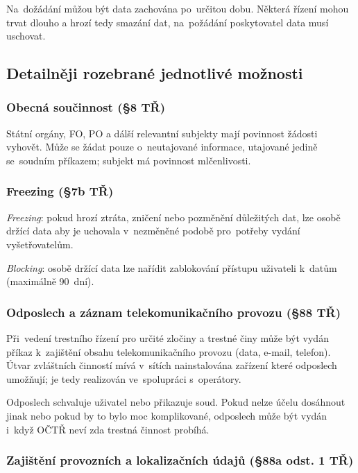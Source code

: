 Na~dožádání můžou být data zachována po~určitou dobu.
Některá řízení mohou trvat dlouho a hrozí tedy smazání dat, na~požádání poskytovatel data musí uschovat.


\subsection{Detailněji rozebrané jednotlivé možnosti}

\subsubsection{Obecná součinnost (§8 TŘ)}

Státní orgány, FO, PO a dálší relevantní subjekty mají povinnost žádosti vyhovět.
Může se žádat pouze o~neutajované informace, utajované jedině se~soudním příkazem; subjekt má povinnost mlčenlivosti.


\subsubsection{Freezing (§7b TŘ)}

\emph{Freezing}: pokud hrozí ztráta, zničení nebo pozměnění důležitých dat, lze osobě držící data aby je uchovala v~nezměněné podobě pro~potřeby vydání vyšetřovatelům.

\emph{Blocking}: osobě držící data lze nařídit zablokování přístupu uživateli k~datům (maximálně 90~dní).

\subsubsection{Odposlech a záznam telekomunikačního provozu (§88 TŘ)}

Při~vedení trestního řízení pro určité zločiny a trestné činy může být vydán příkaz k~zajištění obsahu telekomunikačního provozu (data, e-mail, telefon).
Útvar zvláštních činností mívá v~sítích nainstalována zařízení které odposlech umožňují; je tedy realizován ve~spolupráci s~operátory.

Odposlech schvaluje uživatel nebo přikazuje soud.
Pokud nelze účelu dosáhnout jinak nebo pokud by to bylo moc komplikované, odposlech může být vydán i~když OČTŘ neví zda trestná činnost probíhá.


\subsubsection{Zajištění provozních a lokalizačních údajů (§88a odst. 1 TŘ)}

